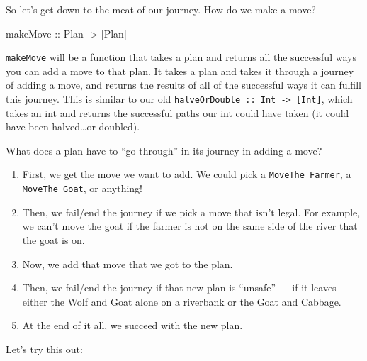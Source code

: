 \documentclass[]{article}
\newenvironment{Shaded}{}{}
\newcommand{\DataTypeTok}[1]{\textcolor[rgb]{0.56,0.13,0.00}{#1}}
\newcommand{\NormalTok}[1]{#1}
\newcommand{\OtherTok}[1]{\textcolor[rgb]{0.00,0.44,0.13}{#1}}
\begin{document}
So let's get down to the meat of our journey. How do we make a move?

\begin{Shaded}
\begin{Highlighting}[]
\OtherTok{makeMove ::} \DataTypeTok{Plan} \OtherTok{->}\NormalTok{ [}\DataTypeTok{Plan}\NormalTok{]}
\end{Highlighting}
\end{Shaded}

\texttt{makeMove} will be a function that takes a plan and returns all the
successful ways you can add a move to that plan. It takes a plan and takes it
through a journey of adding a move, and returns the results of all of the
successful ways it can fulfill this journey. This is similar to our old
\texttt{halveOrDouble\ ::\ Int\ -\textgreater{}\ {[}Int{]}}, which takes an int
and returns the successful paths our int could have taken (it could have been
halved\ldots{}or doubled).

What does a plan have to ``go through'' in its journey in adding a move?

\begin{enumerate}
\def\labelenumi{\arabic{enumi}.}
\tightlist
\item
  First, we get the move we want to add. We could pick a
  \texttt{MoveThe\ Farmer}, a \texttt{MoveThe\ Goat}, or anything!
\item
  Then, we fail/end the journey if we pick a move that isn't legal. For example,
  we can't move the goat if the farmer is not on the same side of the river that
  the goat is on.
\item
  Now, we add that move that we got to the plan.
\item
  Then, we fail/end the journey if that new plan is ``unsafe'' --- if it leaves
  either the Wolf and Goat alone on a riverbank or the Goat and Cabbage.
\item
  At the end of it all, we succeed with the new plan.
\end{enumerate}

Let's try this out:
\end{document}
